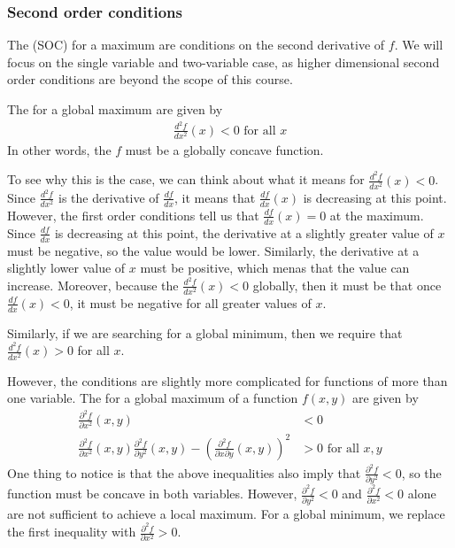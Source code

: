 
\subsubsection*{Second order conditions}
The  (SOC) for a maximum are conditions on the second derivative of $f$. We will focus on the single variable and two-variable case, as higher dimensional second order conditions are beyond the scope of this course.

The  for a global maximum are given by
\begin{align*}
    \frac{d^2f}{dx^2}(x) < 0 \text{ for all $x$}
\end{align*}
In other words, the $f$ must be a globally concave function. 


To see why this is the case, we can think about what it means for $\frac{d^2f}{dx^2}(x) < 0$. Since $\frac{d^2f}{dx^2}$ is the derivative of $\frac{df}{dx}$, it means that $\frac{df}{dx}(x)$ is decreasing at this point. However, the first order conditions tell us that $\frac{df}{dx}(x) = 0$ at the maximum. Since $\frac{df}{dx}$ is decreasing at this point, the derivative at a slightly greater value of $x$ must be negative, so the value would be lower. Similarly, the derivative at a slightly lower value of $x$ must be positive, which menas that the value can increase. Moreover, because the $\frac{d^2f}{dx^2}(x) < 0$ globally, then it must be that once $\frac{df}{dx}(x) < 0$, it must be negative for all greater values of $x$. 

Similarly, if we are searching for a global minimum, then we require that $\frac{d^2f}{dx^2}(x) > 0$ for all $x$. 

However, the conditions are slightly more complicated for functions of more than one variable. The  for a global maximum of a function $f(x, y)$ are given by
\begin{align*}
    \frac{\partial^2f}{\partial x^2}(x, y) &< 0 \\ 
    \frac{\partial^2f}{\partial x^2}(x, y) \frac{\partial^2f}{\partial y^2}(x, y) - \left(\frac{\partial^2f}{\partial x \partial y}(x, y)\right)^2 &> 0 \text{ for all $x, y$}
\end{align*}
One thing to notice is that the above inequalities also imply that $\frac{\partial^2f}{\partial y^2} < 0$, so the function must be concave in both variables. However, $\frac{\partial^2f}{\partial y^2} < 0$ and $\frac{\partial^2f}{\partial x^2} < 0$ alone are not sufficient to achieve a local maximum. For a global minimum, we replace the first inequality with $\frac{\partial^2f}{\partial x^2} > 0$. 

